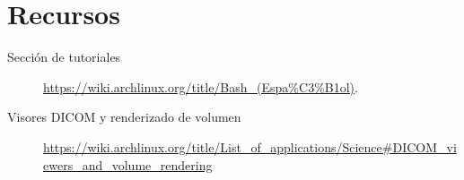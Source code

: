 \documentclass[9pt,a3paper]{scrartcl}
\begin{document}
\section*{\Huge Recursos}

\begin{description}
	\item[Sección de tutoriales] \url{https://wiki.archlinux.org/title/Bash_(Espa%C3%B1ol)}.
	\item[Visores DICOM y renderizado de volumen] \url{https://wiki.archlinux.org/title/List_of_applications/Science#DICOM_viewers_and_volume_rendering}
\end{description}

\vfill

\end{document}
